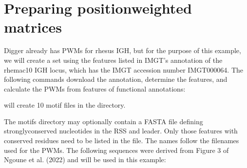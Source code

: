 \documentclass[letterpaper,10pt,english]{sphinxmanual}
\begin{document}
\section{Preparing position\sphinxhyphen{}weighted matrices}
\label{\detokenize{examples/rhesus_igh:preparing-position-weighted-matrices}}
\sphinxAtStartPar
Digger already has PWMs for rhesus IGH, but for the purpose of this example, we will create a set using the features listed in IMGT’s annotation of the rhemac10 IGH locus, which
has the IMGT accession number IMGT000064. The following commands download the annotation, determine the features, and calculate the PWMs from
features of functional annotations:

\begin{sphinxVerbatim}[commandchars=\\\{\}]
  
  
  \PYGZbs{}
         \PYGZbs{}
         
  
\end{sphinxVerbatim}

\sphinxAtStartPar
{} will create 10 motif files in the directory.

\sphinxAtStartPar
The motifs directory may optionally contain a FASTA file  defining strongly\sphinxhyphen{}conserved nucleotides in the RSS and leader. Only those features
with conserved residues need to be listed in the file. The names follow the filenames used for the PWMs.
The following sequences were derived from Figure 3 of Ngoune et al. (2022) and will be used in this example:
\end{document}

